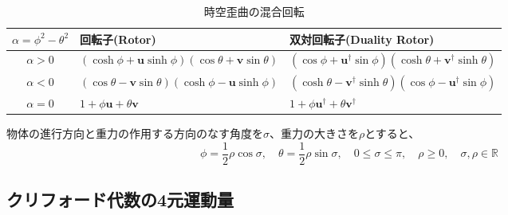 \documentclass[a4paper,12pt,notitlepage]{jsreport}
\begin{document}
\begin{table}[ht]
  \centering
  \caption{時空歪曲の混合回転}
  \begin{tabular}{|c|l|l|} \hline
    $ \alpha = \phi^2 - \theta^2 $ & 回転子(Rotor) & 双対回転子(Duality Rotor) \\ \hline
    $ \alpha > 0 $ & $ (\cosh \phi + \bm{u} \sinh \phi)(\cos \theta + \bm{v} \sin \theta) $
    & $ (\cos \phi + \bm{u}^\dag \sin \phi)(\cosh \theta + \bm{v}^\dag \sinh \theta) $ \\ \hline
    $ \alpha < 0 $ & $ (\cos \theta - \bm{v} \sin \theta)(\cosh \phi - \bm{u} \sinh \phi) $
    & $ (\cosh \theta - \bm{v}^\dag \sinh \theta)(\cos \phi - \bm{u}^\dag \sin \phi) $ \\ \hline
    $ \alpha = 0 $ & $ 1 + \phi \bm{u} + \theta \bm{v} $
    & $ 1 + \phi \bm{u}^\dag + \theta \bm{v}^\dag $ \\ \hline
  \end{tabular}
\end{table}

物体の進行方向と重力の作用する方向のなす角度を$ \sigma $、重力の大きさを$ \rho $とすると、
\begin{equation}
  \phi = \frac{1}{2} \rho \cos \sigma , \quad \theta = \frac{1}{2} \rho \sin \sigma
  , \quad 0 \le \sigma \le \pi , \quad \rho \ge 0 , \quad \sigma,\rho \in \mathbb{R}
\end{equation}

\subsection{クリフォード代数の4元運動量}
\end{document}
